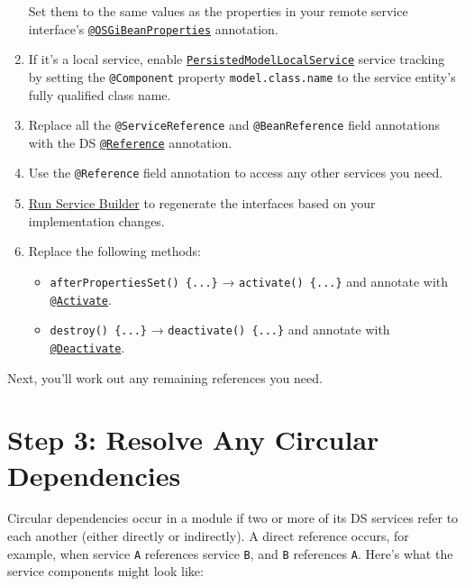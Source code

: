 \begin{enumerate}
  Set them to the same values as the properties in your remote service
  interface's
  \href{https://docs.liferay.com/ce/portal/7.2-latest/javadocs/portal-kernel/com/liferay/portal/kernel/spring/osgi/OSGiBeanProperties.html}{\texttt{@OSGiBeanProperties}}
  annotation.
\item
  If it's a local service, enable
  \href{https://docs.liferay.com/ce/portal/7.2-latest/javadocs/portal-kernel/com/liferay/portal/kernel/service/PersistedModelLocalService.html}{\texttt{PersistedModelLocalService}}
  service tracking by setting the \texttt{@Component} property
  \texttt{model.class.name} to the service entity's fully qualified
  class name.
\item
  Replace all the \texttt{@ServiceReference} and \texttt{@BeanReference}
  field annotations with the DS
  \href{https://osgi.org/javadoc/r6/cmpn/org/osgi/service/component/annotations/Reference.html}{\texttt{@Reference}}
  annotation.
\item
  Use the \texttt{@Reference} field annotation to access any other
  services you need.
\item
  \href{/docs/7-2/appdev/-/knowledge_base/a/running-service-builder}{Run
  Service Builder} to regenerate the interfaces based on your
  implementation changes.
\item
  Replace the following methods:

  \begin{itemize}
  \item
    \texttt{afterPropertiesSet()\ \{...\}} →
    \texttt{activate()\ \{...\}} and annotate with
    \href{https://osgi.org/javadoc/r6/cmpn/org/osgi/service/component/annotations/Activate.html}{\texttt{@Activate}}.
  \item
    \texttt{destroy()\ \{...\}} → \texttt{deactivate()\ \{...\}} and
    annotate with
    \href{https://osgi.org/javadoc/r6/cmpn/org/osgi/service/component/annotations/Deactivate.html}{\texttt{@Deactivate}}.
  \end{itemize}
\end{enumerate}

Next, you'll work out any remaining references you need.

\section{Step 3: Resolve Any Circular
Dependencies}\label{step-3-resolve-any-circular-dependencies}

Circular dependencies occur in a module if two or more of its DS
services refer to each another (either directly or indirectly). A direct
reference occurs, for example, when service \texttt{A} references
service \texttt{B}, and \texttt{B} references \texttt{A}. Here's what
the service components might look like:


